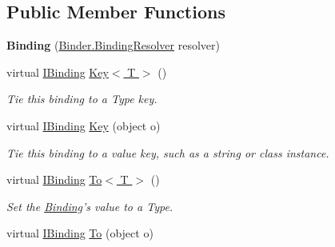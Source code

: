 \subsection*{Public Member Functions}
\begin{DoxyCompactItemize}
\item 
\hypertarget{classstrange_1_1framework_1_1impl_1_1_binding_a50906fc241f67a1b588eebec8266a50e}{{\bfseries Binding} (\hyperlink{classstrange_1_1framework_1_1impl_1_1_binder_aa4e977fc31063ca4d0b029b1abe39dad}{Binder.\-Binding\-Resolver} resolver)}\label{classstrange_1_1framework_1_1impl_1_1_binding_a50906fc241f67a1b588eebec8266a50e}

\item 
\hypertarget{classstrange_1_1framework_1_1impl_1_1_binding_a6134684a8e35cac5fb78a50dfd69f67f}{virtual \hyperlink{interfacestrange_1_1framework_1_1api_1_1_i_binding}{I\-Binding} \hyperlink{classstrange_1_1framework_1_1impl_1_1_binding_a6134684a8e35cac5fb78a50dfd69f67f}{Key$<$ T $>$} ()}\label{classstrange_1_1framework_1_1impl_1_1_binding_a6134684a8e35cac5fb78a50dfd69f67f}

\begin{DoxyCompactList}\small\item\em Tie this binding to a Type key. \end{DoxyCompactList}\item 
\hypertarget{classstrange_1_1framework_1_1impl_1_1_binding_a371a89d365ef6c2ca6dceb8c170bbcd0}{virtual \hyperlink{interfacestrange_1_1framework_1_1api_1_1_i_binding}{I\-Binding} \hyperlink{classstrange_1_1framework_1_1impl_1_1_binding_a371a89d365ef6c2ca6dceb8c170bbcd0}{Key} (object o)}\label{classstrange_1_1framework_1_1impl_1_1_binding_a371a89d365ef6c2ca6dceb8c170bbcd0}

\begin{DoxyCompactList}\small\item\em Tie this binding to a value key, such as a string or class instance. \end{DoxyCompactList}\item 
\hypertarget{classstrange_1_1framework_1_1impl_1_1_binding_af98b1180c87ab8f34268eb0916c7ba84}{virtual \hyperlink{interfacestrange_1_1framework_1_1api_1_1_i_binding}{I\-Binding} \hyperlink{classstrange_1_1framework_1_1impl_1_1_binding_af98b1180c87ab8f34268eb0916c7ba84}{To$<$ T $>$} ()}\label{classstrange_1_1framework_1_1impl_1_1_binding_af98b1180c87ab8f34268eb0916c7ba84}

\begin{DoxyCompactList}\small\item\em Set the \hyperlink{classstrange_1_1framework_1_1impl_1_1_binding}{Binding}'s value to a Type. \end{DoxyCompactList}\item 
\hypertarget{classstrange_1_1framework_1_1impl_1_1_binding_a8459c625c1e51c9fee37bfeac10fbabf}{virtual \hyperlink{interfacestrange_1_1framework_1_1api_1_1_i_binding}{I\-Binding} \hyperlink{classstrange_1_1framework_1_1impl_1_1_binding_a8459c625c1e51c9fee37bfeac10fbabf}{To} (object o)}\label{classstrange_1_1framework_1_1impl_1_1_binding_a8459c625c1e51c9fee37bfeac10fbabf}


\end{DoxyCompactItemize}
